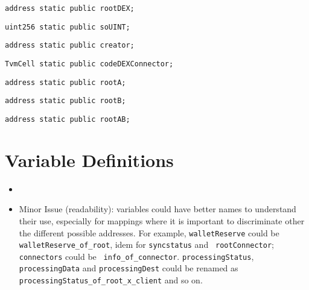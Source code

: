 \begin{lstlisting}[firstnumber=19]
  address static public rootDEX;
\end{lstlisting}

\begin{lstlisting}[firstnumber=20]
  uint256 static public soUINT;
\end{lstlisting}

\begin{lstlisting}[firstnumber=21]
  address static public creator;
\end{lstlisting}

\begin{lstlisting}[firstnumber=22]
  TvmCell static public codeDEXConnector;
\end{lstlisting}

\begin{lstlisting}[firstnumber=23]
  address static public rootA;
\end{lstlisting}

\begin{lstlisting}[firstnumber=24]
  address static public rootB;
\end{lstlisting}

\begin{lstlisting}[firstnumber=25]
  address static public rootAB;
\end{lstlisting}

\section{Variable Definitions}

\begin{itemize}
\item \issueGlobal{}
  \item Minor Issue (readability): variables could have better names
    to understand their use, especially for mappings where it is
    important to discriminate other the different possible
    addresses. For example, {\tt walletReserve} could be {\tt
      walletReserve\_of\_root}, idem for {\tt syncstatus} and {\tt
      rootConnector}; {\tt connectors} could be {\tt
      info\_of\_connector}.  {\tt processingStatus}, {\tt
      processingData} and {\tt processingDest} could be renamed as
    {\tt processingStatus\_of\_root\_x\_client} and so on.
\end{itemize}

